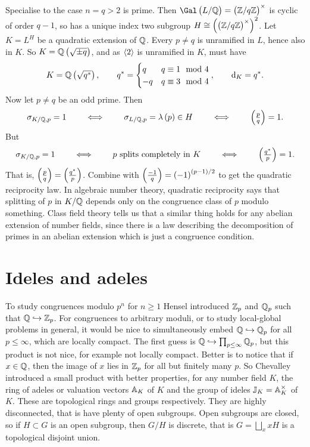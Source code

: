 Specialise to the case $ n = q > 2 $ is prime. Then $ \Gal\br{L / \QQ} = \br{\ZZ / q\ZZ}^\times $ is cyclic of order $ q - 1 $, so has a unique index two subgroup $ H \cong \br{\br{\ZZ / q\ZZ}^\times}^2 $. Let $ K = L^H $ be a quadratic extension of $ \QQ $. Every $ p \ne q $ is unramified in $ L $, hence also in $ K $. So $ K = \QQ\br{\sqrt{\pm q}} $, and as $ \abr{2} $ is unramified in $ K $, must have
$$ K = \QQ\br{\sqrt{q^*}}, \qquad q^* =
\begin{cases}
q & q \equiv 1 \mod 4 \\
-q & q \equiv 3 \mod 4
\end{cases},
\qquad \d_K = q^*. $$
Now let $ p \ne q $ be an odd prime. Then
$$ \sigma_{K / \QQ, p} = 1 \qquad \iff \qquad \sigma_{L / \QQ, p} = \lambda\br{p} \in H \qquad \iff \qquad \br{\tfrac{p}{q}} = 1. $$
But
$$ \sigma_{K / \QQ, p} = 1 \qquad \iff \qquad p \ \text{splits completely in} \ K \qquad \iff \qquad \br{\tfrac{q^*}{p}} = 1. $$
That is, $ \br{\tfrac{p}{q}} = \br{\tfrac{q^*}{p}} $. Combine with $ \br{\tfrac{-1}{q}} = \br{-1}^{\br{p - 1} / 2} $ to get the quadratic reciprocity law. In algebraic number theory, quadratic reciprocity says that splitting of $ p $ in $ K / \QQ $ depends only on the congruence class of $ p $ modulo something. Class field theory tells us that a similar thing holds for any abelian extension of number fields, since there is a law describing the decomposition of primes in an abelian extension which is just a congruence condition.

\pagebreak

\section{Ideles and adeles}

To study congruences modulo $ p^n $ for $ n \ge 1 $ Hensel introduced $ \ZZ_p $ and $ \QQ_p $ such that $ \QQ \hookrightarrow \ZZ_p $. For congruences to arbitrary moduli, or to study local-global problems in general, it would be nice to simultaneously embed $ \QQ \hookrightarrow \QQ_p $ for all $ p \le \infty $, which are locally compact. The first guess is $ \QQ \hookrightarrow \prod_{p \le \infty} \QQ_p $, but this product is not nice, for example not locally compact. Better is to notice that if $ x \in \QQ $, then the image of $ x $ lies in $ \ZZ_p $ for all but finitely many $ p $. So Chevalley introduced a small product with better properties, for any number field $ K $, the ring of adeles or valuation vectors $ \AA_K $ of $ K $ and the group of ideles $ \JJ_K = \AA_K^\times $ of $ K $. These are topological rings and groups respectively. They are highly disconnected, that is have plenty of open subgroups. Open subgroups are closed, so if $ H \subset G $ is an open subgroup, then $ G / H $ is discrete, that is $ G = \bigsqcup_x xH $ is a topological disjoint union.

